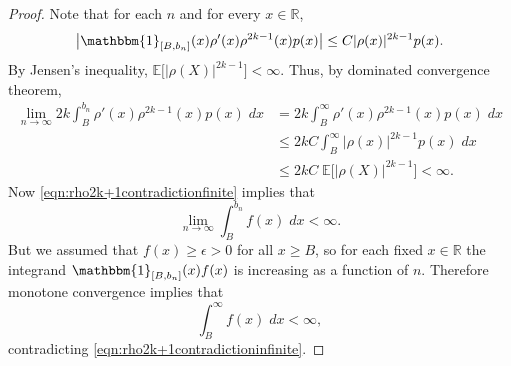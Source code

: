 \documentclass[aos]{imsart}
\newcommand{\ind}{\mathbbm{1}}
\newcommand{\R}{\mathbb{R}}
\newcommand{\E}{\mathbb{E}}
\newtheorem{lemma}[theorem]{Lemma}
\begin{document}
\begin{proof}
		Note that for each $n$ and for every $x\in\R$,
		\begin{equation*}
			\big|\ind_{[B, b_n]}(x)\rho'(x) \rho^{2k-1}(x)p(x)\big|
			\leq C |\rho(x)|^{2k-1}p(x).
		\end{equation*}
		By Jensen's inequality, $\E\big[|\rho(X)|^{2k-1}\big]< \infty$. Thus, by dominated convergence theorem,
		\begin{align*}
			\lim_{n \to \infty} 2k \int_B^{b_n} \rho'(x) \rho^{2k-1}(x) p(x)\;dx &= 2k \int_B^{\infty} \rho'(x) \rho^{2k-1}(x) p(x)\;dx\\
			&\leq 2kC \int_B^{\infty} |\rho(x)|^{2k-1} p(x)\;dx\\
			&\leq 2kC \;\E\big[|\rho(X)|^{2k-1}\big]< \infty.
		\end{align*}
		Now \eqref{eqn:rho2k+1contradictionfinite} implies that \begin{equation*}
			\lim_{n\to\infty} \int_B^{b_n}  f(x)\; dx < \infty.
		\end{equation*}
		But we assumed that $f(x) \geq \epsilon > 0$ for all $x\geq B$, so for each fixed $x\in\R$ the integrand $\ind_{[B,b_n]}(x) f(x) $ is increasing as a function of $n$. Therefore monotone convergence implies that \begin{equation*}
			\int_B^{\infty}  f(x)\; dx < \infty,
		\end{equation*}
		contradicting \eqref{eqn:rho2k+1contradictioninfinite}.
	\end{proof}
	
	
	
\end{document}

